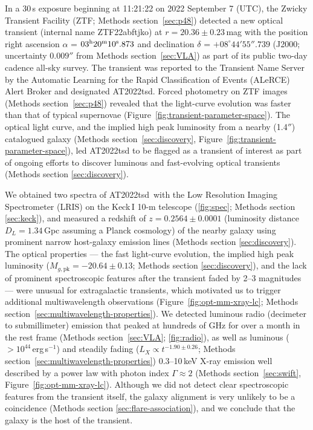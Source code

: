 \documentclass{nature_plusfigure}
\newcommand{\at}{AT2022tsd}
\begin{document}
In a 30\,s exposure beginning at 11:21:22 on 2022 September 7 (UTC), the Zwicky Transient Facility (ZTF; Methods section~\ref{sec:p48}) detected a new optical transient (internal name ZTF22abftjko) at $r=20.36\pm0.23\,$mag with the position right ascension $\alpha$ = $03^{\rm{h}}20^{\rm{m}}10^{\rm{s}}.873$ and declination $\delta$ = $+08^{\circ} 44' 55''.739$ 
(J2000; uncertainty $0.009''$ from Methods section~\ref{sec:VLA}) as part of its public two-day cadence all-sky survey.
The transient was reported\cite{Munoz-Arancibia2022} to the Transient Name Server by the Automatic Learning for the Rapid Classification of Events (ALeRCE) Alert Broker\cite{Forster2021} and designated AT2022tsd.
Forced photometry on ZTF images (Methods section~\ref{sec:p48}) revealed that the light-curve evolution was faster than that of typical supernovae (Figure~\ref{fig:transient-parameter-space}).
The optical light curve, and the implied high peak luminosity from a nearby (1.4$''$) catalogued galaxy (Methods section~\ref{sec:discovery}, Figure~\ref{fig:transient-parameter-space}), led AT2022tsd to be flagged as a transient of interest as part of ongoing efforts to discover luminous and fast-evolving optical transients (Methods section \ref{sec:discovery}).

We obtained two spectra of \at\ with the Low Resolution Imaging Spectrometer (LRIS) on the Keck\,I 10-m telescope (\ref{fig:spec}; Methods section \ref{sec:keck}), and measured\cite{Ho2022_Astronote_Keck} a redshift of $z=0.2564\pm0.0001$ (luminosity distance $D_L=1.34\,$Gpc assuming a Planck cosmology\cite{Planck2020}) of the nearby galaxy using prominent narrow host-galaxy emission lines (Methods section \ref{sec:discovery}). 
The optical properties --- the fast light-curve evolution, the implied high peak luminosity ($M_{g,\mathrm{pk}}=-20.64\pm0.13$; Methods section \ref{sec:discovery}), and the lack of prominent spectroscopic features after the transient faded by 2--3 magnitudes --- were unusual for extragalactic transients, which motivated us to trigger additional multiwavelength observations (Figure~\ref{fig:opt-mm-xray-lc}; Methods section~\ref{sec:multiwavelength-properties}).
We detected luminous radio (decimeter\cite{Ho2022Astronote_radio} to submillimeter) emission that peaked at hundreds of GHz for over a month in the rest frame (Methods section~\ref{sec:VLA}; \ref{fig:radio}),
as well as luminous ($>10^{44}\,$erg\,s$^{-1}$) and steadily fading ($L_X\propto t^{-1.90\pm0.26}$; Methods section~\ref{sec:multiwavelength-properties}) 0.3--10\,keV X-ray emission\cite{Schulze2022Astronote_xray} well described by a power law with photon index $\Gamma\approx2$ (Methods section~\ref{sec:swift}, Figure~\ref{fig:opt-mm-xray-lc}).
Although we did not detect clear spectroscopic features from the transient itself, the galaxy alignment is very unlikely to be a coincidence (Methods section \ref{sec:flare-association}), and we conclude that the galaxy is the host of the transient.
\end{document}
